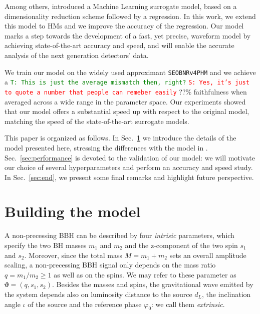 \documentclass[twocolumn,showpacs,preprintnumbers,nofootinbib,prd,
superscriptaddress,10pt]{revtex4-1}
\newcommand{\stefano}[1]{{\textcolor{red}{\texttt{S: #1}} }}
\newcommand{\tim}[1]{{\textcolor{green}{\texttt{T: #1}} }}
\begin{document}
Among others, \cite{Schmidt:2020yuu} introduced a Machine Learning surrogate model, based on a dimensionality reduction scheme followed by a regression. In this work, we extend this model to HMs and we improve the accuracy of the regression. Our model marks a step towards the development of a fast, yet precise, waveform model by achieving state-of-the-art accuracy and speed, and will enable the accurate analysis of the next generation detectors' data.

We train our model on the widely used approximant \texttt{SEOBNRv4PHM} and we achieve a \tim{This is just the average mismatch then, right?} \stefano{Yes, it's just to quote a number that people can remeber easily} ??\% faithfulness when averaged across a wide range in the parameter space.
Our experiments showed that our model offers a substantial speed up with respect to the original model, matching the speed of the state-of-the-art surrogate models.

This paper is organized as follows. In Sec.~\ref{sec:model} we introduce the details of the model presented here, stressing the differences with the model in  \cite{Schmidt:2020yuu}.
Sec.~\ref{sec:performance} is devoted to the validation of our model: we will motivate our choice of several hyperparameters and perform an accuracy and speed study.
In Sec.~\ref{sec:end}, we present some final remarks and highlight future perspective.

\section{Building the model}
\label{sec:model}

A non-precessing BBH can be described by four {\it intrisic} parameters, which specify the two BH masses $m_1$ and $m_2$ and the z-component of the two spin $s_1$ and $s_2$.
Moreover, since the total mass $M = m_1 + m_2$ sets an overall amplitude scaling, a non-precessing BBH signal only depends on the mass ratio $q = m_1/m_2 \geq 1$ as well as on the spins. We may refer to these parameter as $\boldsymbol{\vartheta} = (q, s_1, s_2)$.
Besides the masses and spins, the gravitational wave emitted by the system depends also on luminosity distance to the source $d_L$, the inclination angle $\iota$ of the source and the reference phase $\varphi_0$: we call them {\it extrinsic}.
\end{document}
